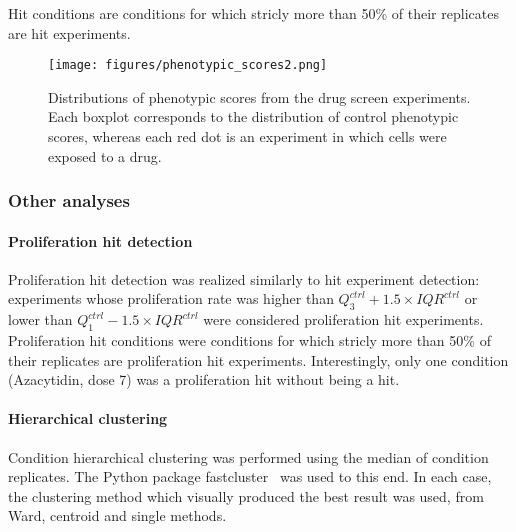 Hit conditions are conditions for which stricly more than 50\% of their replicates are hit experiments.

\begin{figure*}[ht!]
\centerline{\texttt{[image: figures/phenotypic\_scores2.png]}
}
\caption{Distributions of phenotypic scores from the drug screen experiments. Each boxplot corresponds to the distribution of control phenotypic scores, whereas each red dot is an experiment in which cells were exposed to a drug.}
\label{hit_ds}
\end{figure*}

\subsubsection{Other analyses}
\label{sec:other_analyses}
\paragraph*{Proliferation hit detection\\}
Proliferation hit detection was realized similarly to hit experiment detection: experiments whose proliferation rate was higher than $Q_3^{ctrl} + 1.5\times IQR^{ctrl}$ or lower than $Q_1^{ctrl} - 1.5\times IQR^{ctrl}$ were considered proliferation hit experiments. Proliferation hit conditions were conditions for which stricly more than 50\% of their replicates are proliferation hit experiments. Interestingly, only one condition (Azacytidin, dose 7) was a proliferation hit without being a hit.
\paragraph*{Hierarchical clustering\\}
Condition hierarchical clustering was performed using the median of condition replicates. The Python package fastcluster~\cite{fastcluster} was used to this end. In each case, the clustering method which visually produced the best result was used, from Ward, centroid and single methods.

